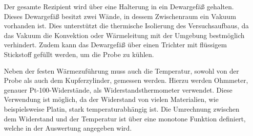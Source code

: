 Der gesamte Rezipient wird über eine Halterung in ein Dewargefäß gehalten.
Dieses Dewargefäß besitzt zwei Wände, in dessem Zwischenraum ein Vakuum vorhanden ist.
Dies unterstützt die thermische Isolierung des Versuchsaufbaus, da das Vakuum die Konvektion oder Wärmeleitung mit der Umgebung bestmöglich verhindert. %
Zudem kann das Dewargefäß über einen Trichter mit flüssigem Stickstoff gefüllt werden, um die Probe zu kühlen.

Neben der festen Wärmezuführung muss auch die Temperatur, sowohl von der Probe als auch dem Kupferzylinder, gemessen werden.
Hierzu werden Ohmmeter, genauer Pt-100-Widerstände, als Widerstandsthermometer verwendet.
Diese Verwendung ist möglich, da der Widerstand von vielen Materialien, wie beispielsweise Platin, stark temperaturabhängig ist.
Die Umrechnung zwischen dem Widerstand und der Temperatur ist über eine monotone Funktion definiert, welche in der Auswertung angegeben wird.
